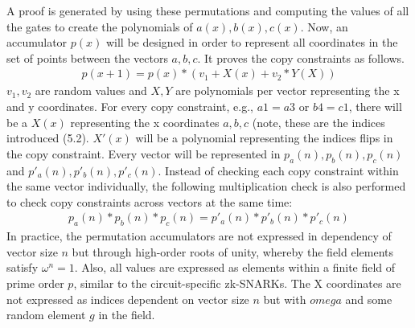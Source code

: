 A proof is generated by using these permutations and computing the values of all the gates to create the polynomials of \(a(x), b(x), c(x)\). Now, an accumulator \(p(x)\) will be designed in order to represent all coordinates in the set of points between the vectors \(a, b, c\). It proves the copy constraints as follows.
\begin{align}
    p(x+1) = p(x) * (v_1 + X(x) + v_2 * Y(X))
\end{align}
\(v_1, v_2\) are random values and \(X, Y\) are polynomials per vector representing the x and y coordinates. For every copy constraint, e.g., \(a1=a3\) or \(b4=c1\), there will be a \(X(x)\) representing the x coordinates \(a,b, c\) (note, these are the indices introduced (5.2). \(X'(x)\) will be a polynomial representing the indices flips in the copy constraint. Every vector will be represented in \(p_{a}(n), p_{b}(n), p_{c}(n)\) and \(p'_{a}(n), p'_{b}(n), p'_{c}(n)\). Instead of checking each copy constraint within the same vector individually, the following multiplication check is also performed to check copy constraints across vectors at the same time:
\begin{align}
    p_{a}(n) * p_{b}(n) * p_{c}(n) = p'_{a}(n) * p'_{b}(n) * p'_{c}(n)
\end{align}
In practice, the permutation accumulators are not expressed in dependency of vector size \(n\) but through high-order roots of unity, whereby the field elements satisfy \(\omega^n = 1\). Also, all values are expressed as elements within a finite field of prime order \(p\), similar to the circuit-specific zk-SNARKs. The X coordinates are not expressed as indices dependent on vector size \(n\) but with \(omega\) and some random element \(g\) in the field.
